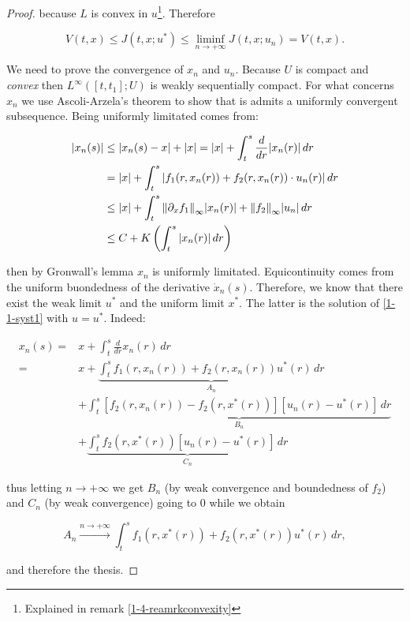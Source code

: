 \begin{theorem}
\begin{proof}
        because $L$ is convex in $u$\footnote{Explained in remark \ref{1-4-reamrkconvexity}}. Therefore

        \[V(t,x)\leq J(t,x;u^{\ast}) \leq \liminf_{n\to+\infty} J(t,x;u_n) = V(t,x).\]

        We need to prove the convergence of $x_n$ and $u_n$. {Because $U$ is compact and \textit{convex} then $L^{\infty}([t,t_1];U)$ is 
        weakly sequentially compact}. For what concerns $x_n$ we use Ascoli-Arzela's theorem to show that is admits a uniformly convergent subsequence. Being 
        uniformly limitated comes from:

        \begin{align*}
            \abs{x_n(s)} & \leq \abs{x_n(s)-x}+\abs{x} = \abs{x} + \int_t^s \frac{d}{dr}\abs{x_n(r)} \,dr \\
            & = \abs{x} + \int_t^s \abs{f_1(r,x_n(r)) + f_2(r,x_n(r))\cdot u_n(r)}\,dr \\
            & \leq \abs{x} + \int_t^s \norm{\partial_xf_1}_{\infty}\abs{x_n(r)} + \norm{f_2}_{\infty}\abs{u_n} \,dr \\
            & \leq C + K\left( \int_t^s \abs{x_n(r)} \,dr \right)   
        \end{align*}

        then by Gronwall's lemma $x_n$ is uniformly limitated. Equicontinuity comes from the uniform buondedness of the
        derivative $\dot{x}_n(s)$. Therefore, we know that there exist the weak limit $u^{\ast}$ and the uniform
        limit $x^{\ast}$. The latter is the solution of \eqref{1-1-syst1} with $u=u^{\ast}$. Indeed:

        \begin{align*}
                x_n(s) = & x + \int_t^s\frac{d}{dr}x_n(r) \,dr\\
                = & x + \underbrace{\int_t^sf_1(r,x_n(r)) + f_2(r,x_n(r))u^{\ast}(r) \,dr}_{A_n} \\ 
                & + \underbrace{\int_t^s \left[f_2(r,x_n(r)) - f_2(r,x^{\ast}(r))\right]\left[u_n(r)-u^{\ast}(r)\right] \,dr}_{B_n} \\
                & + \underbrace{\int_t^s f_2(r,x^{\ast}(r))\left[u_n(r)-u^{\ast}(r)\right] \,dr}_{C_n}
        \end{align*}
        
        thus letting $n\to+\infty$ we get $B_n$ (by weak convergence and boundedness of $f_2$) and $C_n$ (by weak convergence) going to $0$ 
        while we obtain

        \[A_n\xrightarrow{n\to+\infty}\int_t^sf_1(r,x^{\ast}(r))+f_2(r,x^{\ast}(r))u^{\ast}(r)\,dr,\]
        
        and therefore the thesis.
    \end{proof}
\end{theorem}


